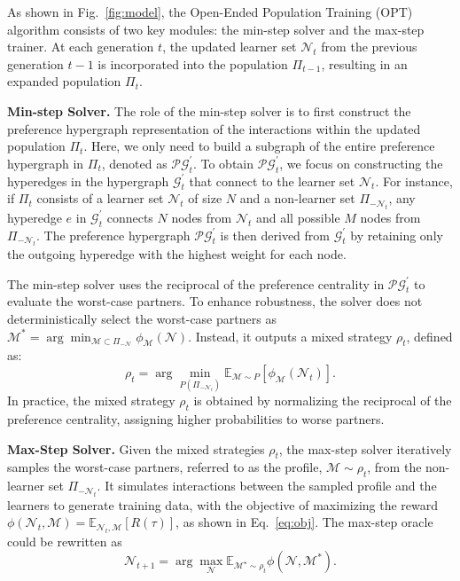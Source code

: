 As shown in Fig.~\ref{fig:model}, the Open-Ended Population Training (OPT) algorithm consists of two key modules: the min-step solver and the max-step trainer. At each generation \(t\), the updated learner set \(\mathcal{N}_{t}\) from the previous generation \(t-1\) is incorporated into the population \(\Pi_{t-1}\), resulting in an expanded population \(\Pi_{t}\).

\textbf{Min-step Solver. }The role of the min-step solver is to first construct the preference hypergraph representation of the interactions within the updated population \(\Pi_{t}\). Here, we only need to build a subgraph of the entire preference hypergraph in \(\Pi_{t}\), denoted as \(\mathcal{P}\mathcal{G}_t^\prime\). To obtain \(\mathcal{P}\mathcal{G}_t^\prime\), we focus on constructing the hyperedges in the hypergraph \(\mathcal{G}_t^\prime\) that connect to the learner set \(\mathcal{N}_t\).
For instance, if \(\Pi_{t}\) consists of a learner set \(\mathcal{N}_{t}\) of size \(N\) and a non-learner set \(\Pi_{-\mathcal{N}_{t}}\), any hyperedge \(e\) in \(\mathcal{G}_t^\prime\) connects \(N\) nodes from \(\mathcal{N}_{t}\) and all possible \(M\) nodes from \(\Pi_{-\mathcal{N}_{t}}\). The preference hypergraph \(\mathcal{P}\mathcal{G}_t^\prime\) is then derived from \(\mathcal{G}_t^\prime\) by retaining only the outgoing hyperedge with the highest weight for each node.

The min-step solver uses the reciprocal of the preference centrality in \(\mathcal{P}\mathcal{G}_t^\prime\) to evaluate the worst-case partners. To enhance robustness, the solver does not deterministically select the worst-case partners as \(\mathcal{M}^* = \arg\min_{\mathcal{M} \subset \Pi_{-\mathcal{N}}} \phi_\mathcal{M}(\mathcal{N})\). Instead, it outputs a mixed strategy \(\rho_t\), defined as:  
\begin{equation}
    \rho_t = \arg\min_{P(\Pi_{-\mathcal{N}_t})} \mathbb{E}_{\mathcal{M} \sim P}[\phi_\mathcal{M}(\mathcal{N}_t)].\label{eq:final_min}
\end{equation}
In practice, the mixed strategy \(\rho_t\) is obtained by normalizing the reciprocal of the preference centrality, assigning higher probabilities to worse partners.



\textbf{Max-Step Solver. }
Given the mixed strategies \(\rho_t\), the max-step solver iteratively samples the worst-case partners, referred to as the profile, \(\mathcal{M} \sim \rho_t\), from the non-learner set \(\Pi_{-\mathcal{N}_t}\). It simulates interactions between the sampled profile and the learners to generate training data, with the objective of maximizing the reward \(\phi(\mathcal{N}_t, \mathcal{M}) = \mathbb{E}_{\mathcal{N}_t, \mathcal{M}}[R(\tau)]\), as shown in Eq.~\ref{eq:obj}.
The max-step oracle could be rewritten as 
\begin{equation}
    \mathcal{N}_{t+1} = \arg\max_{\mathcal{N}} \mathbb{E}_{\mathcal{M}^\star \sim \rho_t} \phi(\mathcal{N}, \mathcal{M}^*).
    \label{eq:final_max}
\end{equation}

